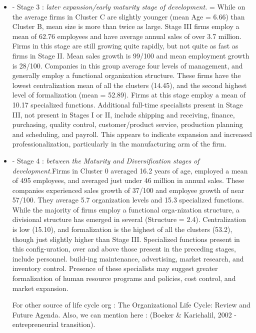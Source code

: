 \begin{itemize}
  \item - Stage 3 : \textit{later expansion/early maturity stage of development.} = While on the average firms in Cluster C are slightly younger (mean Age = 6.66) than Cluster B, mean size is more than twice as large. Stage III firms employ a mean of 62.76 employees and have average annual sales of over 3.7 million. Firms in this stage are still growing quite rapidly, but not quite as fast as firms in Stage II. Mean sales growth is 99/100 and mean employment growth is 28/100. Companies in this group average four levels of management, and generally employ a functional organization structure. These firms have the lowest centralization mean of all the clusters (14.45), and the second highest level of formalization (mean = 52.89). Firms at this stage employ a mean of 10.17 specialized functions. Additional full-time specialists present in Stage III, not present in Stages I or II, include shipping and receiving, finance, purchasing, quality control, customer/product service, production planning and scheduling, and payroll. This appears to indicate expansion and increased professionalization, particularly in the manufacturing arm of the firm.
  \item - Stage 4 : \textit{between the Maturity and Diversification stages of development.}Firms in Cluster 0 averaged 16.2 years of age, employed a mean of 495 employees, and averaged just under 46 million in annual sales. These companies experienced sales growth of 37/100 and employee growth of near 57/100. They average 5.7 organization levels and 15.3 specialized functions. While the majority of firms employ a functional orga-nization structure, a divisional structure has emerged in several (Structure = 2.4). Centralization is low (15.10), and formalization is the highest of all the clusters (53.2), though just slightly higher than Stage III. Specialized functions present in this config-uration, over and above those present in the preceding stages, include personnel. build-ing maintenance, advertising, market research, and inventory control. Presence of these specialists may suggest greater formalization of human resource programs and policies, cost control, and market expansion.

For other source of life cycle org : The Organizational Life Cycle: Review and Future Agenda. Also, we can mention here : (Boeker & Karichalil, 2002 - entrepreneurial transition).


\end{itemize}

